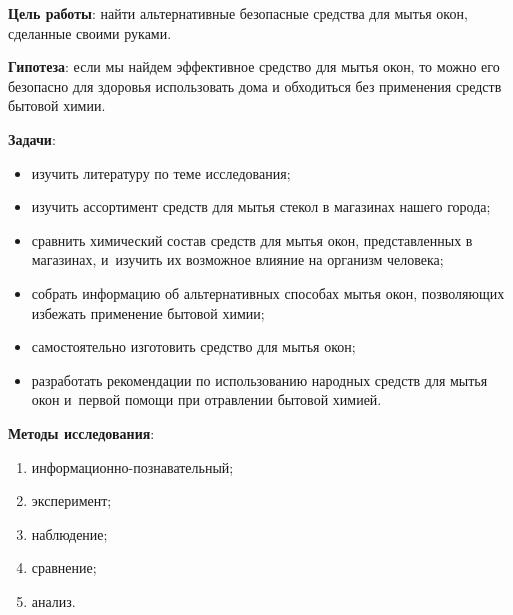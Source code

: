 \bigskip
{}



\makeProcTitleSchool


\textbf{Цель работы}: найти альтернативные безопасные средства для мытья окон, сделанные своими руками.

\textbf{Гипотеза}: если мы найдем эффективное средство для мытья окон, то можно его безопасно для здоровья использовать дома и обходиться без применения средств бытовой химии.

\textbf{Задачи}:

\begin{itemize}[noitemsep]\vspace{-8pt}
\item изучить литературу по теме исследования;
\item изучить ассортимент средств для мытья стекол в магазинах нашего города;
\item сравнить химический состав средств для мытья окон, представленных в магазинах, и~изучить их возможное влияние на организм человека;
\item собрать информацию об альтернативных способах мытья окон, позволяющих избежать применение бытовой химии;
\item самостоятельно изготовить средство для мытья окон;
\item разработать рекомендации по использованию народных средств для мытья окон и~первой помощи при отравлении бытовой химией.
\end{itemize}\vspace{-8pt}

\textbf{Методы исследования}:

\begin{enumerate}[noitemsep]\vspace{-8pt}
\item информационно-познавательный;
\item эксперимент;
\item наблюдение;
\item сравнение;
\item анализ.
\end{enumerate}\vspace{-8pt}

